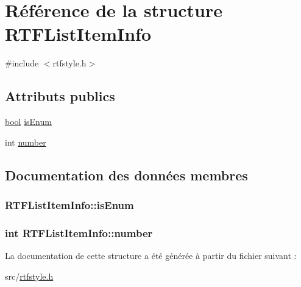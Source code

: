 \hypertarget{struct_r_t_f_list_item_info}{}\section{Référence de la structure R\+T\+F\+List\+Item\+Info}
\label{struct_r_t_f_list_item_info}


{\ttfamily \#include $<$rtfstyle.\+h$>$}

\subsection*{Attributs publics}
\begin{DoxyCompactItemize}
\item 
\hyperlink{qglobal_8h_a1062901a7428fdd9c7f180f5e01ea056}{bool} \hyperlink{struct_r_t_f_list_item_info_abaf669c631b6ebc6e2ffd39907e12a89}{is\+Enum}
\item 
int \hyperlink{struct_r_t_f_list_item_info_ad63139d761c9e72a3547780932056831}{number}
\end{DoxyCompactItemize}


\subsection{Documentation des données membres}
\hypertarget{struct_r_t_f_list_item_info_abaf669c631b6ebc6e2ffd39907e12a89}{}
\subsubsection[{is\+Enum}]{ R\+T\+F\+List\+Item\+Info\+::is\+Enum}\label{struct_r_t_f_list_item_info_abaf669c631b6ebc6e2ffd39907e12a89}
\hypertarget{struct_r_t_f_list_item_info_ad63139d761c9e72a3547780932056831}{}
\subsubsection[{number}]{\setlength{\rightskip}{0pt plus 5cm}int R\+T\+F\+List\+Item\+Info\+::number}\label{struct_r_t_f_list_item_info_ad63139d761c9e72a3547780932056831}


La documentation de cette structure a été générée à partir du fichier suivant \+:\begin{DoxyCompactItemize}
\item 
src/\hyperlink{rtfstyle_8h}{rtfstyle.\+h}\end{DoxyCompactItemize}
